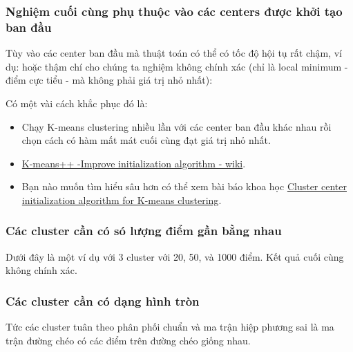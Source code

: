  
\subsubsection{Nghiệm cuối cùng phụ thuộc vào các centers được khởi tạo ban đầu}
Tùy vào các center ban đầu mà thuật toán có thể có tốc độ hội tụ rất chậm, ví dụ: 
hoặc thậm chí cho chúng ta nghiệm không chính xác (chỉ là local minimum - điểm cực tiểu - mà không phải giá trị nhỏ nhất): 
 
 
Có một vài cách khắc phục đó là: 

\begin{itemize}
	\item Chạy K-means clustering nhiều lần với các center ban đầu khác nhau rồi chọn cách có hàm mất mát cuối cùng đạt giá trị nhỏ nhất.

	\item \href{https://en.wikipedia.org/wiki/K-means%2B%2B#Improved_initialization_algorithm}{K-means++ -Improve initialization algorithm - wiki}. 

	\item Bạn nào muốn tìm hiểu sâu hơn có thể xem bài báo khoa học \href{http://www.sciencedirect.com/science/article/pii/S0167865504000996}{Cluster center initialization algorithm for K-means clustering}. 
 
\end{itemize}
 
\subsubsection{Các cluster cần có só lượng điểm gần bằng nhau}
 
Dưới đây là một ví dụ với 3 cluster với 20, 50, và 1000 điểm. Kết quả cuối cùng không chính xác.  
 
 
 
\subsubsection{Các cluster cần có dạng hình tròn }
Tức các cluster tuân theo phân phối chuẩn và ma trận hiệp phương sai là ma trận đường chéo có các điểm trên đường chéo giống nhau. 
 
